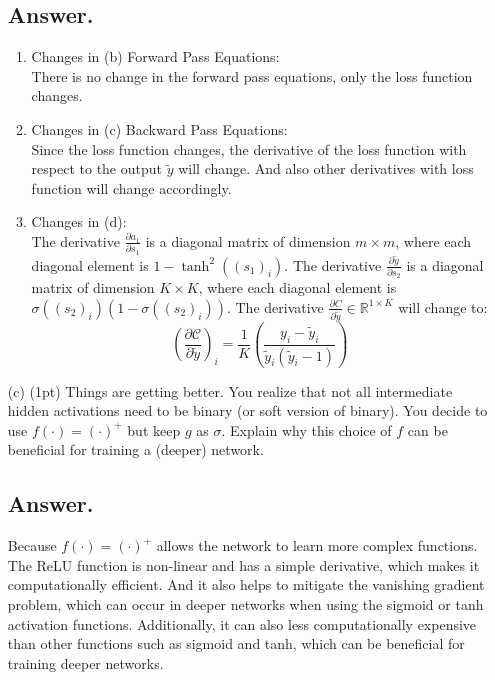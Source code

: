 \documentclass{article}
\begin{document}
\begin{itemize}
    \subsection*{Answer.}
    \begin{enumerate}
        \item{Changes in (b) Forward Pass Equations:}\\
        There is no change in the forward pass equations, only the loss function changes.
        \item {Changes in (c) Backward Pass Equations:} \\
         Since the loss function changes, the derivative of the loss function with respect to the output \(\tilde{y}\) will change. 
         And also other derivatives with loss function will change accordingly.       
        \item{Changes in (d):}\\
        The derivative \( \frac{\partial a_1}{\partial s_1} \) is a diagonal matrix of dimension \( m \times m \), where each diagonal element is \( 1-\tanh^2((s_1)_i) \).
        The derivative \( \frac{\partial \tilde{y}}{\partial s_2} \) is a diagonal matrix of dimension \( K \times K \), where each diagonal element is \( \sigma((s_2)_i)(1 - \sigma((s_2)_i)) \).
        The derivative \( \frac{\partial C}{\partial \tilde{y}} \in \mathbb{R}^{1 \times K} \) will change to: 
        \[\left( \frac{\partial \mathcal{C}}{\partial \tilde{y}} \right)_{i} = \frac{1}{K} \left( \frac{y_i - \tilde{y}_i}{\tilde{y}_i (\tilde{y}_i - 1)} \right)
\]

        
    \end{enumerate}



    \item[(c)] (1pt) Things are getting better. You realize that not all intermediate hidden activations need to be binary (or soft version of binary). You decide to use $f(\cdot) = (\cdot)^+ $ but keep $g$ as $\sigma$. Explain why this choice of $f$ can be beneficial for training a (deeper) network.
    \subsection*{Answer.}
    Because \(f(\cdot) = (\cdot)^+\) allows the network to learn more complex functions. 
    The ReLU function is non-linear and has a simple derivative, which makes it computationally efficient. 
    And it also helps to mitigate the vanishing gradient problem, which can occur in deeper networks when using the sigmoid or tanh activation functions. 
    Additionally, it can also less computationally expensive than other functions such as sigmoid and tanh, which can be beneficial for training deeper networks.
\end{itemize}
\end{document}
